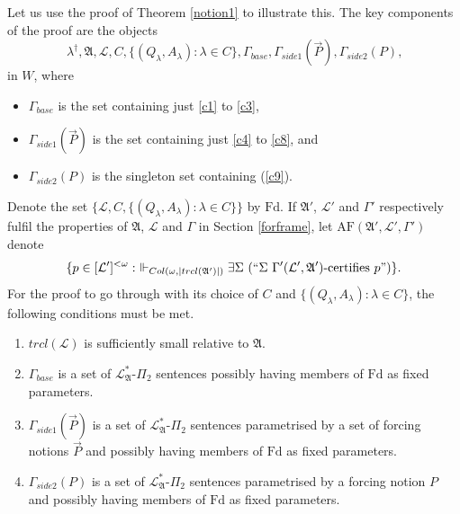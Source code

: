 \documentclass[12pt, twoside]{memoir}
\numberwithin{equation}{section}
\theoremstyle{definition}
\theoremstyle{remark}
\theoremstyle{definition}
\theoremstyle{definition}
\theoremstyle{definition}
\theoremstyle{remark}
\begin{document}
Let us use the proof of Theorem \ref{notion1} to illustrate this. The key components of the proof are the objects
\begin{equation*}
    \lambda^{\dagger}, \mathfrak{A}, \mathcal{L}, C, \{(Q_{\lambda}, A_{\lambda}) : \lambda \in C\}, \Gamma_{base}, \Gamma_{side1}(\Vec{P}), \Gamma_{side2}(P) \text{,}
\end{equation*}
in $W$, where 
\begin{itemize}
    \item $\Gamma_{base}$ is the set containing just \ref{c1} to \ref{c3},
    \item $\Gamma_{side1}(\Vec{P})$ is the set containing just \ref{c4} to \ref{c8}, and
    \item $\Gamma_{side2}(P)$ is the singleton set containing (\ref{c9}).
\end{itemize}
Denote the set $\{\mathcal{L}, C, \{(Q_{\lambda}, A_{\lambda}) : \lambda \in C\}\}$ by $\mathrm{Fd}$. If $\mathfrak{A}'$, $\mathcal{L}'$ and $\Gamma'$ respectively fulfil the properties of $\mathfrak{A}$, $\mathcal{L}$ and $\Gamma$ in Section \ref{forframe}, let $\mathrm{AF}(\mathfrak{A}', \mathcal{L}', \Gamma')$ denote
\begin{equation*}
    \{p \in [\mathcal{L}']^{< \omega} : \ \Vdash_{Col(\omega, |trcl(\mathfrak{A}')|)} \exists \Sigma \ (``\Sigma \ \Gamma'(\mathcal{L}', \mathfrak{A}') \text{-certifies } p")\} \text{.}
\end{equation*}
For the proof to go through with its choice of $C$ and $\{(Q_{\lambda}, A_{\lambda}) : \lambda \in C\}$, the following conditions must be met.
\begin{enumerate}[label=(\alph*)]
    \item\label{intuita} $trcl(\mathcal{L})$ is sufficiently small relative to $\mathfrak{A}$.
    \item $\Gamma_{base}$ is a set of $\mathcal{L}^*_{\mathfrak{A}}$-$\Pi_2$ sentences possibly having members of $\mathrm{Fd}$ as fixed parameters.
    \item $\Gamma_{side1}(\Vec{P})$ is a set of $\mathcal{L}^*_{\mathfrak{A}}$-$\Pi_2$ sentences parametrised by a set of forcing notions $\Vec{P}$ and possibly having members of $\mathrm{Fd}$ as fixed parameters.
    \item\label{intuitd} $\Gamma_{side2}(P)$ is a set of $\mathcal{L}^*_{\mathfrak{A}}$-$\Pi_2$ sentences parametrised by a forcing notion $P$ and possibly having members of $\mathrm{Fd}$ as fixed parameters.
\end{enumerate}
\end{document}

